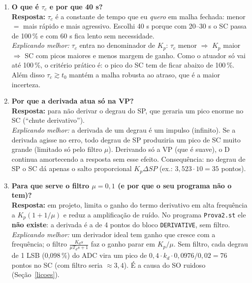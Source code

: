 \documentclass[11pt,a4paper]{article}
\begin{document}
\begin{enumerate}[leftmargin=*]
\emph{Explicando melhor:} a ideia é cancelar a dinâmica da planta com o controlador: o termo $(\tau s+1)$ do numerador de $C$ cancela o polo da planta, e o resultado em malha fechada fica sendo só o que eu escolhi. Não dá para cancelar o atraso (o controlador não pode prever o futuro), por isso a resposta desejada mantém $e^{-t_0s}$. O PID resultante é de forma série; convertemos para a forma paralela do OpenPLC.
\item \textbf{O que é $\tau_c$ e por que 40 s?}\\
\textbf{Resposta:} $\tau_c$ é a constante de tempo que eu \emph{quero} em malha fechada: menor $=$ mais rápido e mais agressivo. Escolhi 40 s porque com 20--30 s o SC passa de 100\,\% e com 60 s fica lento sem necessidade.\\
\emph{Explicando melhor:} $\tau_c$ entra no denominador de $K_p$: $\tau_c$ menor $\Rightarrow$ $K_p$ maior $\Rightarrow$ SC com picos maiores e menos margem de ganho. Como o atuador só vai até 100\,\%, o critério prático é: o pico do SC tem de ficar abaixo de 100\,\%. Além disso $\tau_c\gtrsim t_0$ mantém a malha robusta ao atraso, que é a maior incerteza.
\item \textbf{Por que a derivada atua só na VP?}\\
\textbf{Resposta:} para não derivar o degrau do SP, que geraria um pico enorme no SC (``chute derivativo'').\\
\emph{Explicando melhor:} a derivada de um degrau é um impulso (infinito). Se a derivada agisse no erro, todo degrau de SP produziria um pico de SC muito grande (limitado só pelo filtro $\mu$). Derivando só a VP (que é suave), o D continua amortecendo a resposta sem esse efeito. Consequência: no degrau de SP o SC dá apenas o salto proporcional $K_p\Delta SP$ (ex.: $3{,}523\cdot10=35$ pontos).
\item \textbf{Para que serve o filtro $\mu=0{,}1$ (e por que o seu programa não o tem)?}\\
\textbf{Resposta:} em projeto, limita o ganho do termo derivativo em alta frequência a $K_p(1+1/\mu)$ e reduz a amplificação de ruído. No programa \texttt{Prova2.st} ele \textbf{não existe}: a derivada é a de 4 pontos do bloco \texttt{DERIVATIVE}, sem filtro.\\
\emph{Explicando melhor:} um derivador ideal tem ganho que cresce com a frequência; o filtro $\frac{K_ds}{\mu T_ds+1}$ faz o ganho parar em $K_p/\mu$. Sem filtro, cada degrau de 1 LSB (0,098\,\%) do ADC vira um pico de $0{,}4\cdot k_d\cdot0{,}0976/0{,}02=76$ pontos no SC (com filtro seria $\approx3{,}4$). É a causa do SO ruidoso (Seção~\ref{licoes}).

\end{enumerate}
\end{document}
